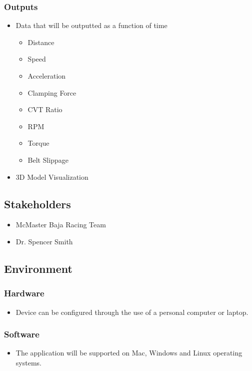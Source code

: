 \documentclass{article}
\begin{document}
\subsubsection{Outputs}
\begin{itemize}
    \item Data that will be outputted as a function of time
    \begin{itemize}
        \item Distance
        \item Speed
        \item Acceleration
        \item Clamping Force
        \item CVT Ratio
        \item RPM
        \item Torque
        \item Belt Slippage
    \end{itemize}
    \item 3D Model Visualization
\end{itemize}

\subsection{Stakeholders}
\begin{itemize}
    \item McMaster Baja Racing Team
    \item Dr. Spencer Smith
\end{itemize}

\subsection{Environment}
\subsubsection{Hardware}
\begin{itemize}
    \item Device can be configured through the use of a personal computer or laptop.
\end{itemize}
    \subsubsection{Software}
\begin{itemize}
    \item The application will be supported on Mac, Windows and Linux operating
    systems.
\end{itemize}
\end{document}
